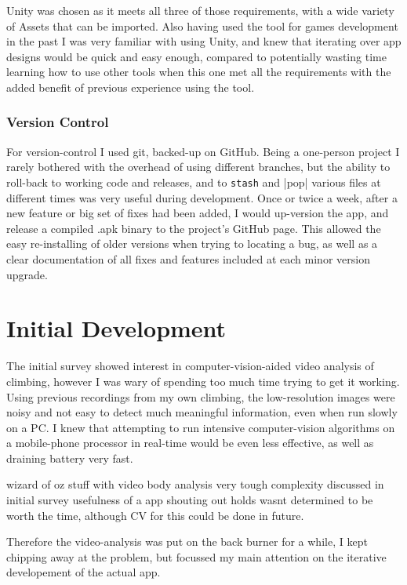 Unity was chosen as it meets all three of those requirements, with a wide variety of Assets that can be imported.
Also having used the tool for games development in the past I was very familiar with using Unity, and knew that iterating over app designs would be quick and easy enough, compared to potentially wasting time learning how to use other tools when this one met all the requirements with the added benefit of previous experience using the tool.

\subsubsection{Version Control}
For version-control I used git, backed-up on GitHub.
Being a one-person project I rarely bothered with the overhead of using different branches, but the ability to roll-back to working code and releases, and to \verb|stash| and \stash|pop| various files at different times was very useful during development.
Once or twice a week, after a new feature or big set of fixes had been added, I would up-version the app, and release a compiled .apk binary to the project's GitHub page.
This allowed the easy re-installing of older versions when trying to locating a bug, as well as a clear documentation of all fixes and features included at each minor version upgrade.


\section{Initial Development}
The initial survey showed interest in computer-vision-aided video analysis of climbing, however I was wary of spending too much time trying to get it working.
Using previous recordings from my own climbing, the low-resolution images were noisy and not easy to detect much meaningful information, even when run slowly on a PC.
I knew that attempting to run intensive computer-vision algorithms on a mobile-phone processor in real-time would be even less effective, as well as draining battery very fast.

wizard of oz stuff with video body analysis
very tough complexity discussed in initial survey
usefulness of a app shouting out holds wasnt determined to be worth the time, although CV for this could be done in future.


Therefore the video-analysis was put on the back burner for a while, I kept chipping away at the problem, but focussed my main attention on the iterative developement of the actual app.


